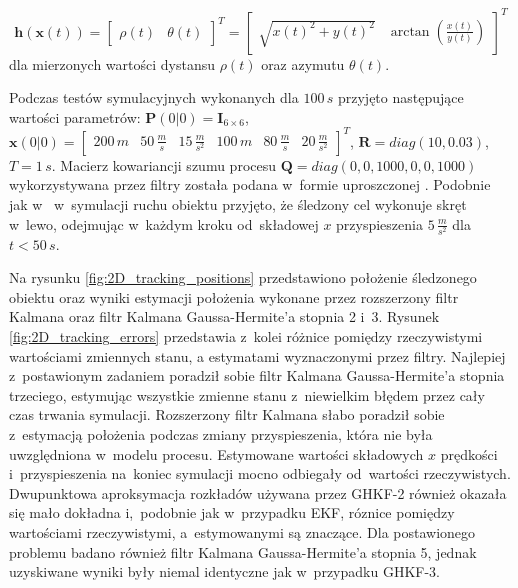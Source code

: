 \begin{equation} 
\boldsymbol{h}(\boldsymbol{x}(t))=\begin{bmatrix}
\rho(t) & \theta(t)
\end{bmatrix}^T = \begin{bmatrix}
\sqrt{x(t)^2 + y(t)^2} & \arctan(\frac{x(t)}{y(t)})
\end{bmatrix}^T
\end{equation}
dla mierzonych wartości dystansu $\rho(t)$ oraz azymutu $\theta(t)$. \par
Podczas testów symulacyjnych wykonanych dla $100\,s$ przyjęto następujące wartości parametrów: $\boldsymbol{P}(0|0) = \boldsymbol{I}_{6 \times 6}$, $\boldsymbol{x}(0|0)=\begin{bmatrix}
200\,m & 50\,\frac{m}{s} & 15\,\frac{m}{s^2} & 100\,m & 80\,\frac{m}{s} & 20\,\frac{m}{s^2}
\end{bmatrix}^T$, $\boldsymbol{R}=diag(10, 0.03)$, $T=1\,s$. Macierz kowariancji szumu procesu $\boldsymbol{Q}=diag(0,0,1000,0,0,1000)$ wykorzystywana przez filtry została podana w~formie uproszczonej \cite[247]{labbe2014}. Podobnie jak w~\cite{Konatowski_2D_Tracking} w~symulacji ruchu obiektu przyjęto, że śledzony cel wykonuje skręt w~lewo, odejmując w~każdym kroku od~składowej $x$ przyspieszenia $5\,\frac{m}{s^2}$ dla $t<50\,s$. \par
Na rysunku \ref{fig:2D_tracking_positions} przedstawiono położenie śledzonego obiektu oraz wyniki estymacji położenia wykonane przez rozszerzony filtr Kalmana oraz filtr Kalmana Gaussa-Hermite'a stopnia 2 i~3. Rysunek \ref{fig:2D_tracking_errors} przedstawia z~kolei różnice pomiędzy rzeczywistymi wartościami zmiennych stanu, a estymatami wyznaczonymi przez filtry. Najlepiej z~postawionym zadaniem poradził sobie filtr Kalmana Gaussa-Hermite'a stopnia trzeciego, estymując wszystkie zmienne stanu z~niewielkim błędem przez cały czas trwania symulacji. Rozszerzony filtr Kalmana słabo poradził sobie z~estymacją położenia podczas zmiany przyspieszenia, która nie była uwzględniona w~modelu procesu. Estymowane wartości składowych $x$ prędkości i~przyspieszenia na~koniec symulacji mocno odbiegały od~wartości rzeczywistych. Dwupunktowa aproksymacja rozkładów używana przez GHKF-2 również okazała się mało dokładna i,~podobnie jak w~przypadku EKF, róznice pomiędzy wartościami rzeczywistymi, a~estymowanymi są znaczące. Dla postawionego problemu badano również filtr Kalmana Gaussa-Hermite'a stopnia 5, jednak uzyskiwane wyniki były niemal identyczne jak w~przypadku GHKF-3. \par
